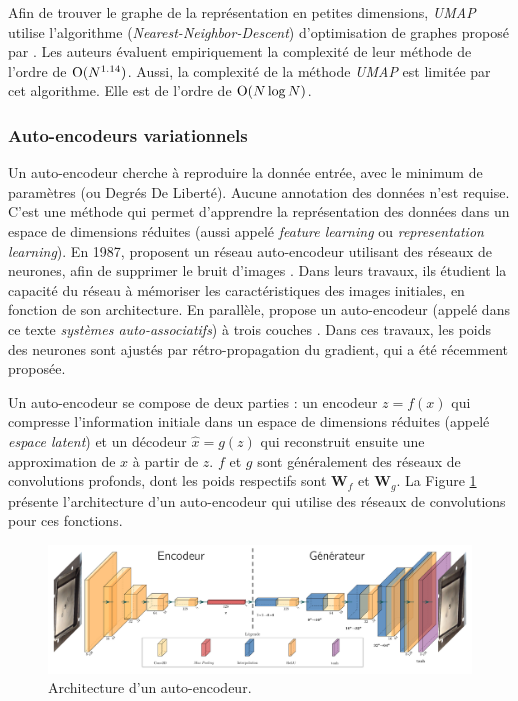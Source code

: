 Afin de trouver le graphe de la représentation en petites dimensions, \textit{UMAP} utilise l'algorithme (\textit{Nearest-Neighbor-Descent}) d'optimisation de graphes proposé par \citeauthor{dong_efficient_2011} \cite{dong_efficient_2011}.
Les auteurs évaluent empiriquement la complexité de leur méthode de l'ordre de $\operatorname{O}(N^{1.14})$.
Aussi, la complexité de la méthode \textit{UMAP} est limitée par cet algorithme.
Elle est de l'ordre de $\operatorname{O}(N \log N)$.


\subsubsection{Auto-encodeurs variationnels} \label{subsubsec:vae}
Un auto-encodeur cherche à reproduire la donnée entrée, avec le minimum de paramètres (ou Degrés De Liberté).
Aucune annotation des données n'est requise.
C'est une méthode qui permet d'apprendre la représentation des données dans un espace de dimensions réduites (aussi appelé \textit{feature learning} ou \textit{representation learning}).
En 1987, \citeauthor{lecun_modeles_1987, gallinari_memoires_1987} proposent un réseau auto-encodeur utilisant des réseaux de neurones, afin de supprimer le bruit d'images \cite{lecun_modeles_1987, gallinari_memoires_1987}.
Dans leurs travaux, ils étudient la capacité du réseau à mémoriser les caractéristiques des images initiales, en fonction de son architecture.
En parallèle, \citeauthor{ballard_modular_1987} propose un auto-encodeur (appelé dans ce texte \textit{systèmes auto-associatifs}) à trois couches \cite{ballard_modular_1987}.
Dans ces travaux, les poids des neurones sont ajustés par rétro-propagation du gradient, qui a été récemment proposée.

Un auto-encodeur se compose de deux parties : un encodeur $z = f(x)$ qui compresse l'information initiale dans un espace de dimensions réduites (appelé \textit{espace latent}) et un décodeur $\hat x = g(z)$ qui reconstruit ensuite une approximation de $x$ à partir de $z$.
$f$ et $g$ sont généralement des réseaux de convolutions profonds, dont les poids respectifs sont $\mathbf{W}_f$ et $\mathbf{W}_g$.
La Figure \ref{fig:autoencoder_architecture} présente l'architecture d'un auto-encodeur qui utilise des réseaux de convolutions pour ces fonctions.

\begin{figure}[hbtp]
	\centering
	\includegraphics[width=\textwidth,height=\textheight,keepaspectratio]{../Chap4/Figures/autoencoder_architecture.pdf}
	\caption{Architecture d'un auto-encodeur.}
	\label{fig:autoencoder_architecture}
\end{figure}

